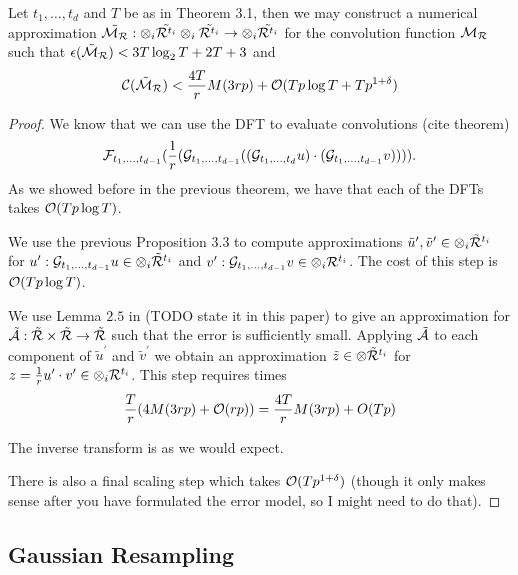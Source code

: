 \begin{proposition}
    Let $t_1, \ldots, t_d$ and $T$ be as in Theorem 3.1, then we may construct a numerical approximation $\tilde{\mathcal M_{\mathcal R}}: \otimes_i \tilde{\mathcal R^{t_i}} \otimes_i \tilde{\mathcal R^{t_i}} \to \otimes_i \tilde{\mathcal R^{t_i}}$ for the convolution function $\mathcal M_{\mathcal R}$ such that $\epsilon(\tilde{\mathcal M}_{\mathcal R}) < 3T \log_2 T + 2T + 3$ and
    \[
        \mathcal C(\tilde{\mathcal M}_{\mathcal R}) < \frac{4T}{r}M(3rp) + \mathcal O(Tp \log T + T p^{1 + \delta})
    \]
\end{proposition}

\begin{proof}
    We know that we can use the DFT to evaluate convolutions (cite theorem)
    \[
        \mathcal F_{t_1,\ldots, t_{d-1}}(\frac{1}{r}(\mathcal G_{t_1, \ldots, t_{d-1}}((\mathcal G_{t_1, \ldots, t_d}u)\cdot (\mathcal G_{t_1, \ldots, t_{d-1}} v)))).
    \]
    As we showed before in the previous theorem, we have that each of the DFTs takes $\mathcal O(Tp\log T)$.

    We use the previous Proposition 3.3 to compute approximations $\tilde{u}^\prime, \tilde{v}^\prime \in \otimes_i \tilde{\mathcal R}^{t_i}$ for $u^\prime: \mathcal G_{t_1, \ldots, t_{d-1}} u \in \otimes_i \tilde{\mathcal R}^{t_i}$ and $v^\prime: \mathcal G_{t_1, \ldots, t_{d-1}} v \in \otimes_i \mathcal R^{t_i}$. The cost of this step is $\mathcal O(Tp \log T)$.

    We use Lemma $2.5$ in \cite{nlogn} (TODO state it in this paper) to give an approximation for $\tilde{\mathcal A}: \tilde{\mathcal R} \times \tilde{\mathcal R} \to \tilde{\mathcal R}$ such that the error is sufficiently small. Applying $\tilde{\mathcal A}$ to each component of $\tilde{u}^\prime$ and $\tilde{v}^\prime$ we obtain an approximation $\tilde{z} \in \otimes \tilde{\mathcal R}^{t_i}$ for $z = \frac{1}{r}u^\prime \cdot v^\prime \in \otimes_i \mathcal R^{t_i}$. This step requires times
    \[
        \frac{T}{r}(4M(3rp) + \mathcal O(rp)) = \frac{4T}{r} M(3rp) + O(Tp)
    \]

    The inverse transform is as we would expect.

    There is also a final scaling step which takes $\mathcal O(Tp^{1 + \delta})$ (though it only makes sense after you have formulated the error model, so I might need to do that).
\end{proof}

\subsection{Gaussian Resampling}

